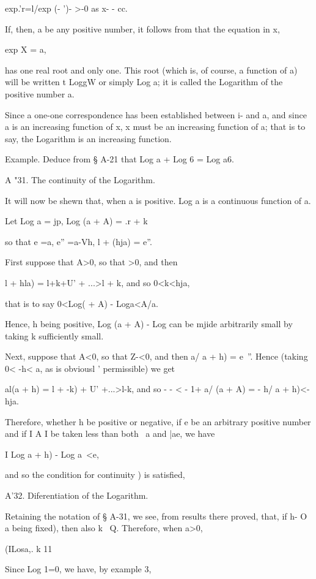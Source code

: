 exp.'r=l/exp (- ')- >-0 as x- - cc.

If, then, a be any positive number, it follows from  that the
equation in x,

exp X = a,

has one real root and only one. This root (which is, of course, a
function of a) will be written t LoggW or simply Log a; it is called
the Logarithm of the positive number a.

Since a one-one correspondence has been established between i- and a,
and since a is an increasing function of x, x must be an increasing
function of a; that is to say, the Logarithm is an increasing
function.

Example. Deduce from § A-21 that Log a + Log 6 = Log a6.

A "31. The continuity of the Logarithm.

It will now be shewn that, when a is positive. Log a is a continuous
function of a.

Let Log a = jp, Log (a + A) = .r + k

so that e =a, e'' =a-Vh, l + (hja) = e''.

First suppose that A>0, so that >0, and then

l + hla) = l+k+U' + ...>l + k, and so 0<k<hja,

that is to say 0<Log( + A) - Loga<A/a.

Hence, h being positive, Log (a + A) - Log can be mjide arbitrarily
small by taking k sufficiently small.

Next, suppose that A<0, so that Z-<0, and then a/ a + h) = e~''. Hence
(taking 0< -h< a, as is obviousl ' permissible) we get

al(a + h) = l + -k) + U' +...>l-k, and so - - < - 1+ a/ (a + A) = - h/
a + h)<- hja.

Therefore, whether h be positive or negative, if e be an arbitrary
positive number and if I A I be taken less than both \ a and |ae, we
have

I Log a + h) - Log a\ <e,

and so the condition for continuity ) is satisfied,

A'32. Diferentiation of the Logarithm.

Retaining the notation of § A-31, we see, from results there proved,
 that, if h- O a being fixed), then also k ~Q. Therefore, when a>0,

(ILosa,. k 11

Since Log 1=0, we have, by  example 3,

